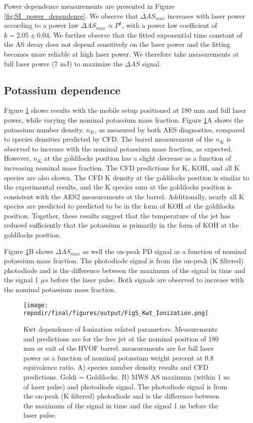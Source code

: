 Power dependence measurements are presented in Figure \ref{fig:SI_power_dependence}. We observe that $\Delta AS_{max}$ increases with laser power according to a power law $\Delta AS_{max} \propto P^{k}$, with a power law coefficient of $k = 2.05 \pm 0.04$. We further observe that the fitted exponential time constant of the AS decay does not depend sensitively on the laser power and the fitting becomes more reliable at high laser power. We therefore take measurements at full laser power (7 mJ) to maximize the $\Delta AS$ signal.


\clearpage

\subsection{Potassium dependence}

Figure \ref{fig:kwt_ionization} shows results with the mobile setup positioned at 180 mm and full laser power, while varying the nominal potassium mass fraction. Figure \ref{fig:kwt_ionization}A shows the potassium number density, $n_K$, as measured by both AES diagnostics, compared to species densities predicted by CFD. The barrel measurement of the $n_K$ is observed to increase with the nominal potassium mass fraction, as expected. However, $n_K$ at the goldilocks position has a slight decrease as a function of increasing nominal mass fraction. The CFD predictions for K, KOH, and all K species are also shown.  The CFD K density at the goldilocks position is similar to the experimental results, and the K species sum at the goldilocks position is consistent with the AES2 measurements at the barrel. Additionally, nearly all K species are predicted to predicted to be in the form of KOH at the goldilocks position. Together, these results suggest that the temperature of the jet has reduced sufficiently that the potassium is primarily in the form of KOH at the goldilocks position.

Figure  \ref{fig:kwt_ionization}B shows $\Delta AS_{max}$ as well the on-peak PD signal as a function of nominal potassium mass fraction. The photodiode signal is from the on-peak (K filtered) photodiode and is the difference between the maximum of the signal in time and the signal 1 $\mu s$ before the laser pulse. Both signals are observed to increase with the nominal potassium mass fraction. 

\begin{figure}[h]
    \texttt{[image: \\repodir/final/figures/output/Fig5\_Kwt\_Ionization.png]} 
    \caption{Kwt dependence of Ionization related parameters. Measurements and predictions are for the free jet at the nominal position of 180 mm or exit of the HVOF barrel. measurements are for full laser power as a function of nominal potassium weight percent at 0.8 equivalence ratio. A) species number density results and CFD predictions. Goldi = Goldilocks. B) MWS AS maximum (within 1 us of laser pulse) and photodiode signal. The photodiode signal is from the on-peak (K filtered) photodiode and is the difference between the maximum of the signal in time and the signal 1 us before the laser pulse.  }
    \label{fig:kwt_ionization}
\end{figure}


